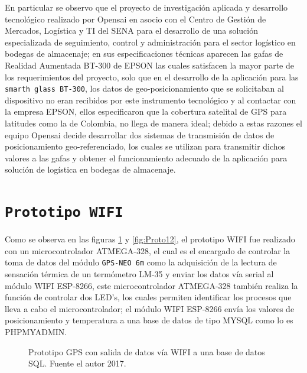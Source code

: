 \documentclass[jou]{apa6} %
\begin{document}
En particular se observo que el proyecto de investigación aplicada y desarrollo tecnológico realizado por Opensai en asocio con el Centro de Gestión de Mercados, Logística y TI del SENA para el desarrollo de una solución especializada de seguimiento, control y administración para el sector logístico en bodegas de almacenaje; en sus especificaciones técnicas aparecen las gafas de Realidad Aumentada BT-300 de EPSON las cuales satisfacen la mayor parte de los requerimientos del proyecto, solo que en el desarrollo de la aplicación para las \texttt{smarth glass BT-300}, los datos de geo-posicionamiento que se solicitaban al dispositivo no eran recibidos por este instrumento tecnológico y al contactar con la empresa EPSON, ellos especificaron que la cobertura satelital de GPS para latitudes como la de Colombia, no llega de manera ideal; debido a estas razones el equipo Opensai decide desarrollar dos sistemas de transmisión de datos de posicionamiento geo-referenciado, los cuales se utilizan para transmitir dichos valores a las gafas y obtener el funcionamiento adecuado de la aplicación para solución de logística en bodegas de almacenaje.  

\section{\texttt{Prototipo WIFI}}

Como se observa en las figuras \ref{fig:Proto1-1} y \ref{fig:Proto12}, el prototipo WIFI fue realizado con un microcontrolador ATMEGA-328, el cual es el encargado de controlar la toma de datos del módulo \texttt{GPS-NEO 6m} como la adquisición de la lectura de sensación térmica de un termómetro LM-35 y enviar los datos vía serial al módulo WIFI ESP-8266, este microcontrolador ATMEGA-328 también realiza la función de controlar dos LED's, los cuales permiten identificar los procesos que lleva a cabo el microcontrolador; el módulo WIFI ESP-8266 envía los valores de posicionamiento y temperatura a una base de datos de tipo MYSQL como lo es PHPMYADMIN.

\begin{figure}[htb]
  \centering
\setlength\fboxsep{0pt}
\setlength\fboxrule{0.5pt}
  \caption{\footnotesize Prototipo GPS con salida de datos vía WIFI a una base de datos SQL. Fuente el autor 2017.}
  \label{fig:Proto1-1}  
\end{figure}
\end{document}
